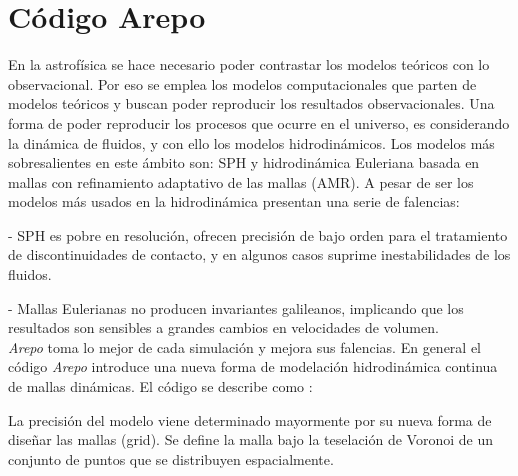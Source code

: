 \section{Código Arepo}
\label{sec: codigo arepo}


En la astrofísica se hace necesario poder contrastar los modelos teóricos con lo observacional. Por eso se emplea los modelos computacionales que parten de  modelos teóricos y buscan poder reproducir los resultados observacionales. Una forma de poder reproducir los procesos que ocurre en el universo, es considerando la dinámica de fluidos, y con ello los modelos hidrodinámicos. Los modelos más sobresalientes en este ámbito son: SPH \cite{monaghan1992} y hidrodinámica Euleriana basada en mallas \cite{stone2008} con refinamiento adaptativo de las mallas (AMR). A pesar de ser los modelos más usados en la hidrodinámica presentan una serie de falencias:

- SPH es pobre en resolución,  ofrecen precisión de bajo orden para el tratamiento de discontinuidades de contacto, y en algunos casos suprime inestabilidades de los fluidos.

- Mallas Eulerianas no producen invariantes galileanos, implicando que los resultados son sensibles a grandes cambios en velocidades de volumen.\\

{\it{Arepo}} toma lo mejor de cada simulación y mejora sus falencias. En general el código {\it{Arepo}} introduce una nueva forma de modelación hidrodinámica continua de mallas dinámicas. El código se describe como \cite{springel2010}:

La precisión del modelo viene determinado mayormente por su nueva forma de diseñar las mallas (grid). Se define la malla bajo la teselación de Voronoi de un conjunto de puntos que se distribuyen espacialmente.

